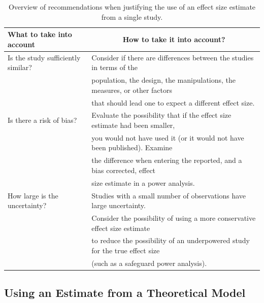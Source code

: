 \documentclass[
  english,
  ,jou, a4paper,floatsintext]{apa6}
\begin{document}
\begin{table}[tbp]

\begin{center}
\begin{threeparttable}

\caption{\label{tab:table-es-just}Overview of recommendations when justifying the use of an effect size estimate from a single study.}

\begin{tabular}{ll}
\toprule
What to take into account & \multicolumn{1}{c}{How to take it into account?}\\
\midrule
Is the study sufficiently similar? & Consider if there are differences between the studies in terms of the\\
 & population, the design, the manipulations, the measures, or other factors\\
 & that should lead one to expect a different effect size.\\ \midrule
Is there a risk of bias? & Evaluate the possibility that if the effect size estimate had been smaller,\\
 & you would not have used it (or it would not have been published). Examine\\
 & the difference when entering the reported, and a bias corrected, effect\\
 & size estimate in a power analysis.\\ \midrule
How large is the uncertainty? & Studies with a small number of observations have large uncertainty.\\
 & Consider the possibility of using a more conservative effect size estimate\\
 & to reduce the possibility of an underpowered study for the true effect size\\
 & (such as a safeguard power analysis).\\
\bottomrule
\end{tabular}

\end{threeparttable}
\end{center}

\end{table}

\hypertarget{using-an-estimate-from-a-theoretical-model}{%
\subsection{Using an Estimate from a Theoretical Model}\label{using-an-estimate-from-a-theoretical-model}}
\end{document}
